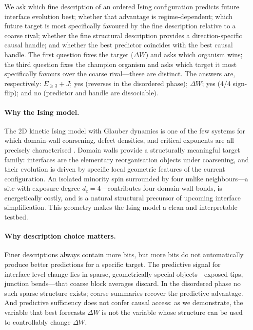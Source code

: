 \documentclass[11pt,a4paper]{article}
\begin{document}
We ask which fine description of an ordered Ising configuration predicts
future interface evolution best; whether that advantage is regime-dependent;
which future target is most specifically favoured by the fine description
relative to a coarse rival; whether the fine structural description
provides a direction-specific causal handle; and whether the best predictor
coincides with the best causal handle.
The first question fixes the target ($\Delta W$) and asks which organism
wins; the third question fixes the champion organism and asks which target
it most specifically favours over the coarse rival---these are distinct.
The answers are, respectively:
$E_{\geq 3}+J$; yes (reverses in the disordered phase); $\Delta W$; yes
(4/4 sign-flip); and no (predictor and handle are dissociable).

\paragraph{Why the Ising model.}
The 2D kinetic Ising model with Glauber dynamics
\citep{ising1925,glauber1963} is one of the few systems for which
domain-wall coarsening, defect densities, and critical exponents are
all precisely characterised \citep{bray1994}.
Domain walls provide a structurally meaningful target family: interfaces
are the elementary reorganisation objects under coarsening, and their
evolution is driven by specific local geometric features of the current
configuration.
An isolated minority spin surrounded by four unlike neighbours---a
site with exposure degree $d_c = 4$---contributes four domain-wall bonds,
is energetically costly, and is a natural structural precursor of upcoming
interface simplification.
This geometry makes the Ising model a clean and interpretable testbed.

\paragraph{Why description choice matters.}
Finer descriptions always contain more bits, but more bits do not
automatically produce better predictions for a specific target.
The predictive signal for interface-level change lies in sparse,
geometrically special objects---exposed tips, junction bends---that
coarse block averages discard.
In the disordered phase no such sparse structure exists; coarse summaries
recover the predictive advantage.
And predictive sufficiency does not confer causal access: as we
demonstrate, the variable that best forecasts $\Delta W$ is not the
variable whose structure can be used to controllably change $\Delta W$.
\end{document}
